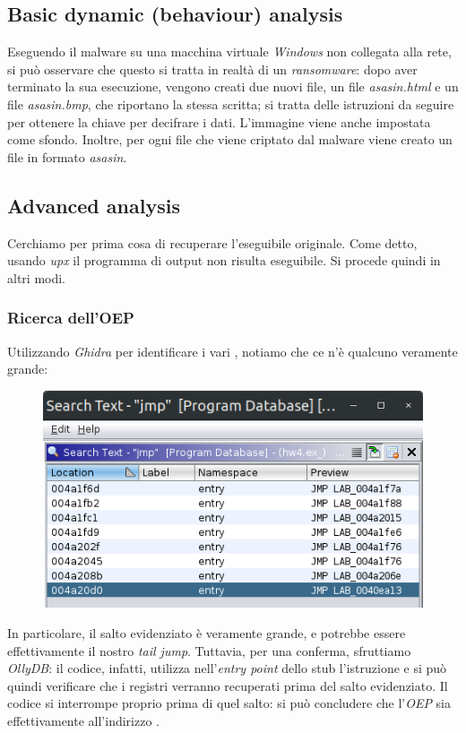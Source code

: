 \documentclass[a4paper, 12pt]{article}
\newcommand{\code}[1]{\colorbox{cverbbg}{\texttt{\StrSubstitute{#1}{_}{\_}}}}
\newcommand{\win}{\textit{Windows}}
\newcommand{\ghidra}{\emph{Ghidra}}
\newcommand{\ollydb}{\emph{OllyDB}}
\newcommand{\key}[1]{\texttt{\StrSubstitute{#1}{_}{\_}}}
\begin{document}
\subsection{Basic dynamic (behaviour) analysis}
Eseguendo il malware su una macchina virtuale \win{} non collegata alla rete, si può osservare che questo si tratta in realtà di un \textit{ransomware}: dopo aver terminato la sua esecuzione, vengono creati due nuovi file, un file \textit{asasin.html} e un file \textit{asasin.bmp}, che riportano la stessa scritta; si tratta delle istruzioni da seguire per ottenere la chiave per decifrare i dati. L'immagine viene anche impostata come sfondo. Inoltre, per ogni file che viene criptato dal malware viene creato un file in formato \textit{asasin}.

\subsection{Advanced analysis}
Cerchiamo per prima cosa di recuperare l'eseguibile originale. Come detto, usando \textit{upx} il programma di output non risulta eseguibile. Si procede quindi in altri modi.

\subsubsection{Ricerca dell'OEP}
Utilizzando \ghidra{} per identificare i vari \key{JMP}, notiamo che ce n'è qualcuno veramente grande:
\begin{figure}[H]
\centering \includegraphics[scale=0.4]{jumps}
\end{figure}
\noindent
In particolare, il salto evidenziato è veramente grande, e potrebbe essere effettivamente il nostro \textit{tail jump}. Tuttavia, per una conferma, sfruttiamo \ollydb{}: il codice, infatti, utilizza nell'\textit{entry point} dello stub l'istruzione \code{PUSHAD} e si può quindi verificare che i registri verranno recuperati prima del salto evidenziato. Il codice si interrompe proprio prima di quel salto: si può concludere che l'\textit{OEP} sia effettivamente all'indirizzo \key{0x0040ea13}.
\end{document}
